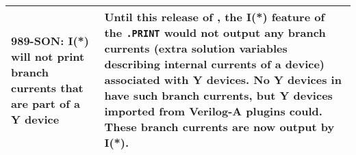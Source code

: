 {\begin{longtable}[h] {>{\raggedright\small}m{2in}|>{\raggedright\let\\\tabularnewline\small}m{3.5in}}
\textbf{989-SON}: I(*) will not print branch currents that are part of a Y
device & Until this release of \Xyce{}, the I(*) feature of
the \texttt{.PRINT} would not output any branch currents (extra
solution variables describing internal currents of a device)
associated with Y devices.  No Y devices in \Xyce{} have such branch
currents, but Y devices imported from Verilog-A plugins could.  These
branch currents are now output by I(*).

\\ \hline



\end{longtable}
}

